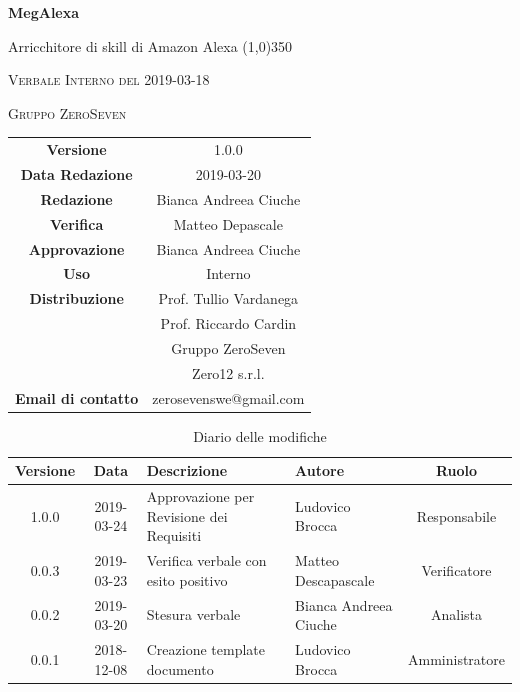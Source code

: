\documentclass[a4paper,12pt]{article}
\author{Bianca Andreea Ciuche}
\date{2019-03-20}
\begin{document}
	\begin{titlepage}
		\centering
		{\huge\bfseries MegAlexa\par}
		Arricchitore di skill di Amazon Alexa
		\line(1,0){350} \\
		{\scshape\LARGE Verbale Interno del 2019-03-18 \par}
		\vspace{1cm}
		{\scshape Gruppo ZeroSeven \par}
		\logo
		\begin{tabular}{c|c}
			{\hfill \textbf{Versione}} 			& 1.0.0				\\
			{\hfill\textbf{Data Redazione}} 	& 2019-03-20		\\ 
			{\hfill\textbf{Redazione}} 			&  		Bianca Andreea Ciuche		\\ 
			{\hfill\textbf{Verifica}} 				&  	 Matteo Depascale \\ 
			{\hfill\textbf{Approvazione}} 		&  	Bianca Andreea Ciuche\\ 
			{\hfill\textbf{Uso}} 					& 	Interno	\\ 
			{\hfill\textbf{Distribuzione}} 			& 			Prof. Tullio Vardanega \\ & Prof. Riccardo Cardin \\ & Gruppo ZeroSeven \\ & Zero12 s.r.l.	\\ 
			{\hfill\textbf{Email di contatto}} & zerosevenswe@gmail.com \\
		\end{tabular}
	\end{titlepage}
	
	
	
	\label{LastFrontPage}
	
	
	\newpage
	\cleardoublepage
	\begin{table}[tbph]
		\centering
		\begin{tabularx}{\textwidth}{|c|c|X|X|c|}
			\hline
			\textbf{Versione} & \textbf{Data} & \textbf{Descrizione} & \textbf{Autore} & \textbf{Ruolo} \\
			\hline
			1.0.0 & 2019-03-24 & Approvazione per Revisione dei Requisiti & Ludovico Brocca &  Responsabile \\
			\hline
			0.0.3 & 2019-03-23 & Verifica verbale con esito positivo & Matteo Descapascale  & Verificatore \\
			\hline
			0.0.2 & 2019-03-20 & Stesura verbale &Bianca Andreea Ciuche  & Analista \\
			\hline
			0.0.1 & 2018-12-08 & Creazione template documento & Ludovico Brocca & Amministratore\\
			\hline
		\end{tabularx}
		\caption{Diario delle modifiche}
	\end{table}
	\cleardoublepage
	\pagestyle{mymain}
	
\end{document}
